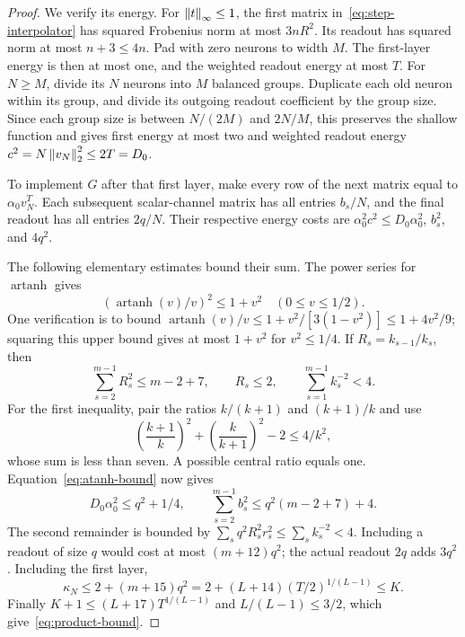 \begin{proof}
We verify its energy. For $\left\Vert t\right\Vert_\infty\le1$, the first matrix
in~\eqref{eq:step-interpolator} has squared Frobenius norm at most
$3nR^2$. Its readout has squared norm at most $n+3\le4n$.
Pad with zero neurons to width $M$. The first-layer energy is then
at most one, and the weighted readout energy at most $T$.
For $N\ge M$, divide its $N$ neurons into $M$ balanced groups.
Duplicate each old neuron within its group, and divide its outgoing
readout coefficient by the group size. Since each group size is
between $N/(2M)$ and $2N/M$, this preserves the shallow function and
gives first energy at most two and weighted readout energy
$c^2=N\left\Vert v_N\right\Vert_2^2\le2T=D_0$.

To implement $G$ after that first layer, make every row of the next
matrix equal to $\alpha_0v_N^T$. Each subsequent scalar-channel
matrix has all entries $b_s/N$, and the final readout has all entries
$2q/N$. Their respective energy costs are
$\alpha_0^2c^2\le D_0\alpha_0^2$, $b_s^2$, and $4q^2$.

The following elementary estimates bound their sum. The power series
for $\operatorname{artanh}$ gives
\begin{equation}\label{eq:atanh-bound}
 (\operatorname{artanh}(v)/v)^2\le1+v^2\quad(0\le v\le1/2).
\end{equation}
One verification is to bound
$\operatorname{artanh}(v)/v\le1+v^2/[3(1-v^2)]\le1+4v^2/9$;
squaring this upper bound gives at most $1+v^2$ for $v^2\le1/4$.
If $R_s=k_{s-1}/k_s$, then
\[
 \sum_{s=2}^{m-1}R_s^2\le m-2+7,\qquad
 R_s\le2,\qquad \sum_{s=1}^{m-1}k_s^{-2}<4.
\]
For the first inequality, pair the ratios $k/(k+1)$ and $(k+1)/k$
and use
\[
 \left(\frac{k+1}{k}\right)^2+
 \left(\frac{k}{k+1}\right)^2-2\le4/k^2,
\]
whose sum is less than seven. A possible central ratio equals one.
Equation~\eqref{eq:atanh-bound} now gives
\[
 D_0\alpha_0^2\le q^2+1/4,\qquad
 \sum_{s=2}^{m-1}b_s^2\le q^2(m-2+7)+4.
\]
The second remainder is bounded by
$\sum_s q^2R_s^2r_s^2\le\sum_s k_s^{-2}<4$.
Including a readout of size $q$ would cost at most $(m+12)q^2$;
the actual readout $2q$ adds $3q^2$. Including the first layer,
\[
 \kappa_N\le2+(m+15)q^2
 =2+(L+14)(T/2)^{1/(L-1)}\le K.
\]
Finally $K+1\le(L+17)T^{1/(L-1)}$ and $L/(L-1)\le3/2$,
which give~\eqref{eq:product-bound}.
\end{proof}
